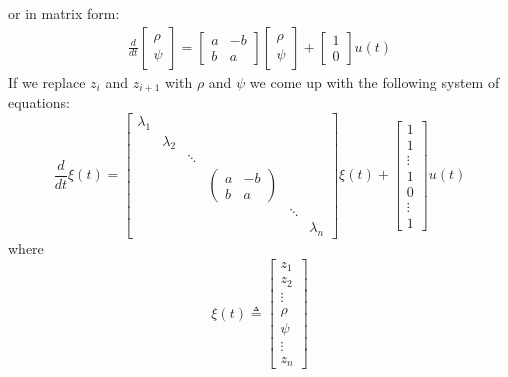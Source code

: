 \documentclass[a4paper,10pt,oneside]{book}
\begin{document}
or in matrix form:
\begin{eqnarray}
\frac{d}{dt}\left[ {\begin{array}{c}
 \rho \\
 \psi \end{array} } \right]=
 \left[ {\begin{array}{cc}
 a & -b \\
 b & a \end{array} } \right]\left[ {\begin{array}{c}
 \rho \\
 \psi \end{array} } \right]+
\left[ {\begin{array}{c}
 1 \\
 0 \end{array} } \right]
u(t)
\end{eqnarray}
If we replace $z_i$ and $z_{i+1}$ with $\rho$ and $\psi$ we come up with the following system of equations:
\begin{equation}\label{RV90}
 \frac{d}{dt}\xi(t) = 
\left[ {\begin{array}{cccccc}
 \lambda_1 & & & & &   \\
 & \lambda_2 & & & &   \\
 & & \ddots & & &  \\
 & & & \left( {\begin{array}{cc} a &-b\\b&a \end{array} } \right)  & & \\
 & & & & \ddots & \\
 & & & & & \lambda_n
 \end{array} } \right]
\xi(t)+
\left[ {\begin{array}{c}
 1 \\
 1 \\
 \vdots  \\
 1\\
 0\\
 \vdots  \\
 1
 \end{array} } \right]
 u(t)
\end{equation} 
where
\begin{equation}
 \xi(t)\triangleq\left[ {\begin{array}{c}
 z_1 \\
 z_2 \\
 \vdots  \\
 \rho \\
 \psi \\
 \vdots\\
 z_n
 \end{array} } \right]
\end{equation}
\end{document}
